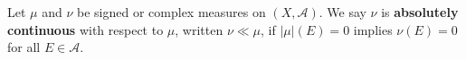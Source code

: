 Let $\mu$ and $\nu$ be signed or complex measures on $(X, \mathcal{A})$. We say $\nu$ is \textbf{absolutely continuous} with respect to $\mu$, written $\nu \ll \mu$, if $|\mu|(E) = 0$ implies $\nu(E) = 0$ for all $E \in \mathcal{A}$.
